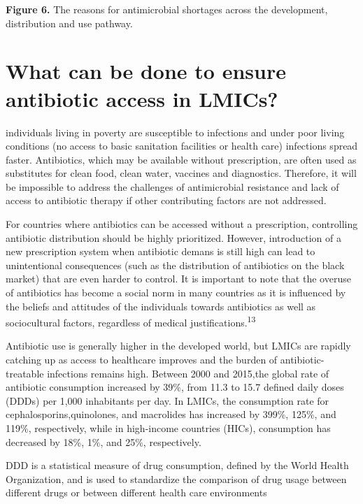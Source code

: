 \documentclass[
]{book}
\begin{document}
\textbf{Figure 6.} The reasons for antimicrobial shortages across the development, distribution and use pathway.

\hypertarget{what-can-be-done-to-ensure-antibiotic-access-in-lmics}{%
\section*{What can be done to ensure antibiotic access in LMICs?}\label{what-can-be-done-to-ensure-antibiotic-access-in-lmics}}

individuals living in poverty are susceptible to infections and under poor living conditions (no access to basic sanitation facilities or health care) infections spread faster. Antibiotics, which may be available without prescription, are often used as substitutes for clean food, clean water, vaccines and diagnostics. Therefore, it will be impossible to address the challenges of antimicrobial resistance and lack of access to antibiotic therapy if other contributing factors are not addressed.

For countries where antibiotics can be accessed without a prescription, controlling antibiotic distribution should be highly prioritized. However, introduction of a new prescription system when antibiotic demans is still high can lead to unintentional consequences (such as the distribution of antibiotics on the black market) that are even harder to control. It is important to note that the overuse of antibiotics has become a social norm in many countries as it is influenced by the beliefs and attitudes of the individuals towards antibiotics as well as sociocultural factors, regardless of medical justifications.\textsuperscript{13}

Antibiotic use is generally higher in the developed world, but LMICs are rapidly catching up as access to healthcare improves and the burden of antibiotic-treatable infections remains high. Between 2000 and 2015,the global rate of antibiotic consumption increased by 39\%, from 11.3 to 15.7 defined daily doses (DDDs) per 1,000 inhabitants per day. In LMICs, the consumption rate for cephalosporins,quinolones, and macrolides has increased by 399\%, 125\%, and 119\%, respectively, while in high-income countries (HICs), consumption has decreased by 18\%, 1\%, and 25\%, respectively.

DDD is a statistical measure of drug consumption, defined by the World Health Organization, and is used to standardize the comparison of drug usage between different drugs or between different health care environments
\end{document}
